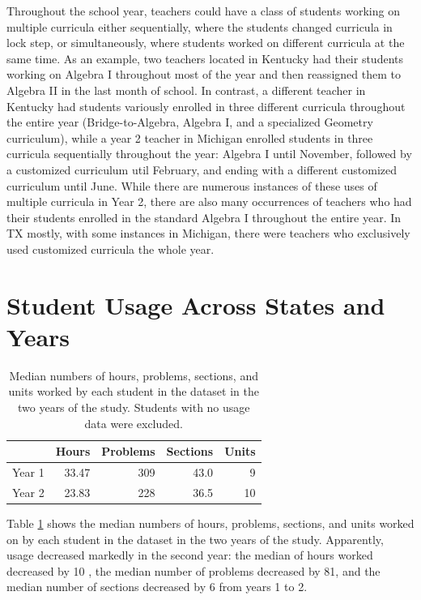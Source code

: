 \documentclass[12pt]{article}\usepackage[]{graphicx}\usepackage[]{color}
\begin{document}
Throughout the school year, teachers could have a class of students
working on multiple curricula either sequentially, where the students
changed curricula in lock step, or simultaneously, where students
worked on different curricula at the same time. As an example, two
teachers located in Kentucky had their students working on Algebra I
throughout most of the year and then reassigned them to Algebra II in
the last month of school. In contrast, a different teacher in Kentucky had students variously
enrolled in three different curricula throughout the entire year
(Bridge-to-Algebra, Algebra I, and a specialized Geometry curriculum),
while a year 2 teacher in Michigan enrolled students in
three curricula sequentially throughout the year: Algebra I
until November, followed by a customized curriculum util February, and
ending with a different customized curriculum until June. While there are numerous instances of these
uses of multiple curricula in Year 2, there are also many occurrences
of teachers who had their students enrolled in the standard Algebra I
throughout the entire year.  In TX mostly, with some instances in Michigan,
there were teachers who exclusively used customized curricula the
whole year.

\section{Student Usage Across States and Years}\label{sec:usage}

\begin{table}[ht]
\centering
\begin{tabular}{rrrrr}
  \hline
 & Hours & Problems & Sections & Units \\ 
  \hline
Year 1 & 33.47 & 309 & 43.0 & 9 \\ 
  Year 2 & 23.83 & 228 & 36.5 & 10 \\ 
   \hline
\end{tabular}
\caption{Median numbers of hours, problems, sections, and units worked by each student in the dataset in the two years of the study. Students with no usage data were excluded.} 
\label{tab:medUsage}
\end{table}



Table \ref{tab:medUsage} shows the median numbers of hours,
problems, sections, and units worked on by each student in the dataset
in the two years of the study.
Apparently, usage decreased markedly in the second year: the median
of hours worked decreased by
10
, the median number of problems decreased by
81, and
the median number of sections decreased by
6 from
years 1 to 2.
\end{document}
